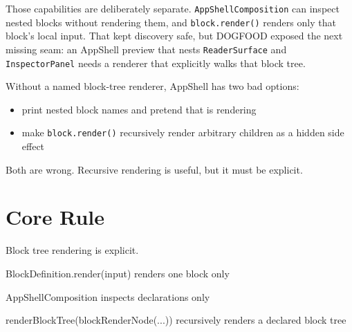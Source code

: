 Those capabilities are deliberately separate. \texttt{A\allowbreak{}p\allowbreak{}p\allowbreak{}S\allowbreak{}h\allowbreak{}e\allowbreak{}l\allowbreak{}l\allowbreak{}C\allowbreak{}o\allowbreak{}m\allowbreak{}p\allowbreak{}o\allowbreak{}s\allowbreak{}i\allowbreak{}t\allowbreak{}i\allowbreak{}o\allowbreak{}n} can inspect nested blocks without rendering them, and \texttt{b\allowbreak{}l\allowbreak{}o\allowbreak{}c\allowbreak{}k\allowbreak{}.\allowbreak{}r\allowbreak{}e\allowbreak{}n\allowbreak{}d\allowbreak{}e\allowbreak{}r\allowbreak{}(\allowbreak{})} renders only that block's local input. That kept discovery safe, but DOGFOOD exposed the next missing seam: an AppShell preview that nests \texttt{R\allowbreak{}e\allowbreak{}a\allowbreak{}d\allowbreak{}e\allowbreak{}r\allowbreak{}S\allowbreak{}u\allowbreak{}r\allowbreak{}f\allowbreak{}a\allowbreak{}c\allowbreak{}e} and \texttt{I\allowbreak{}n\allowbreak{}s\allowbreak{}p\allowbreak{}e\allowbreak{}c\allowbreak{}t\allowbreak{}o\allowbreak{}r\allowbreak{}P\allowbreak{}a\allowbreak{}n\allowbreak{}e\allowbreak{}l} needs a renderer that explicitly walks that block tree.

Without a named block-tree renderer, AppShell has two bad options:

\begin{itemize}
\tightlist
\item
  print nested block names and pretend that is rendering
\item
  make \texttt{b\allowbreak{}l\allowbreak{}o\allowbreak{}c\allowbreak{}k\allowbreak{}.\allowbreak{}r\allowbreak{}e\allowbreak{}n\allowbreak{}d\allowbreak{}e\allowbreak{}r\allowbreak{}(\allowbreak{})} recursively render arbitrary children as a hidden side effect
\end{itemize}

Both are wrong. Recursive rendering is useful, but it must be explicit.

\section{Core Rule}\label{record-129-core-rule}

Block tree rendering is explicit.

\begin{CodeBlock}
BlockDefinition.render(input)
  renders one block only

AppShellComposition
  inspects declarations only

renderBlockTree(blockRenderNode(...))
  recursively renders a declared block tree
\end{CodeBlock}

